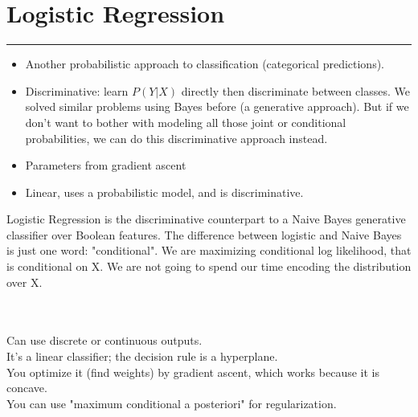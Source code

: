 \section{Logistic Regression}
\smallskip \hrule height 2pt \smallskip

\begin{itemize}
	\item Another probabilistic approach to classification (categorical predictions).  \hfill \\
	\item Discriminative: learn $P(Y|X)$ directly then discriminate between classes.    %
		We solved similar problems using Bayes before (a generative approach).  
	But if we don't want to bother with modeling all those joint or conditional probabilities, we can do this discriminative approach instead. \hfill \\  %
	\item Parameters from gradient ascent %
	\item Linear, uses a probabilistic model, and is discriminative.%
\end{itemize}

Logistic Regression is the discriminative counterpart to a Naive Bayes generative classifier over Boolean features.  %
The difference between logistic and Naive Bayes is just one word: "conditional".   %
We are maximizing conditional log likelihood, that is conditional on X.  
	We are not going to spend our time encoding the distribution over X.   %

\hfill \\   \hfill \\

Can use discrete or continuous outputs. \hfill \\ %
It's a linear classifier; the decision rule is a hyperplane. \hfill \\  %
You optimize it (find weights) by gradient ascent, which works because it is concave.    \hfill \\  %
You can use "maximum conditional a posteriori" for regularization.    \hfill \\  %

\hfill \\ 

